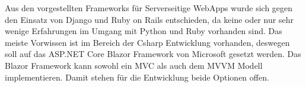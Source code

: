 Aus den vorgestellten Frameworks für Serverseitige WebApps wurde sich gegen den Einsatz von Django und Ruby on Rails entschieden, da keine oder nur sehr wenige Erfahrungen im Umgang mit Python und Ruby vorhanden sind. Das meiste Vorwissen ist im Bereich der Csharp Entwicklung vorhanden, deswegen soll auf das ASP.NET Core Blazor Framework von Microsoft gesetzt werden. Das Blazor Framework kann sowohl ein MVC als auch dem MVVM Modell implementieren. Damit stehen für die Entwicklung beide Optionen offen.




